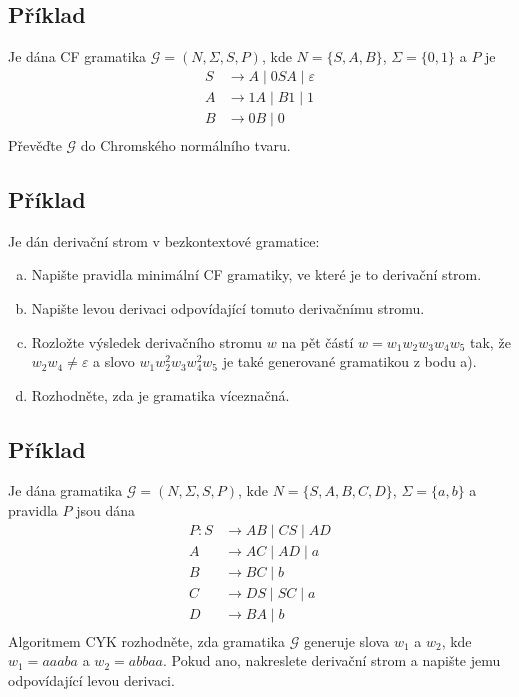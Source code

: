\subsection{Příklad}
Je dána CF gramatika $\mathcal{G} = (N, \Sigma, S, P)$, kde $N = \{S,A,B\}$, $\Sigma = \{0,1\}$ a $P$ je
\begin{align*}
    S & \rightarrow A \mid 0SA \mid \varepsilon \\
    A & \rightarrow 1A \mid B1 \mid 1 \\
    B & \rightarrow 0B \mid 0 \\ 
\end{align*}
Převěďte $\mathcal{G}$ do Chromského normálního tvaru.

\subsection{Příklad}
Je dán derivační strom v bezkontextové gramatice:

\begin{enumerate}[a), noitemsep]
    \item Napište pravidla minimální CF gramatiky, ve které je to derivační strom.
    \item Napište levou derivaci odpovídající tomuto derivačnímu stromu.
    \item Rozložte výsledek derivačního stromu $w$ na pět částí $w = w_1 w_2 w_3 w_4 w_5$ tak, že 
    $w_2 w_4 \not= \varepsilon$ a slovo $w_1 w_2^2 w_3 w_4^2 w_5$ je také generované gramatikou z bodu a).
    \item Rozhodněte, zda je gramatika víceznačná.
\end{enumerate}

\subsection{Příklad}
Je dána gramatika $\mathcal{G} = (N, \Sigma, S, P)$, kde $N = \{S,A,B,C,D\}$, $\Sigma = \{a,b\}$ a pravidla $P$ jsou dána
\begin{align*}
  P:  S & \rightarrow AB \mid CS \mid AD \\
    A & \rightarrow AC \mid AD \mid a \\
    B & \rightarrow BC \mid b \\ 
    C & \rightarrow DS \mid SC \mid a \\
    D & \rightarrow BA \mid b \\
\end{align*}
Algoritmem CYK rozhodněte, zda gramatika $\mathcal{G}$ generuje slova $w_1$ a $w_2$, kde $w_1 = aaaba$ a $w_2 = abbaa$. 
Pokud ano, nakreslete derivační strom a napište jemu odpovídající levou derivaci.


